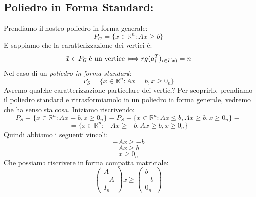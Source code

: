 \subsection{Poliedro in Forma Standard:} 
Prendiamo il nostro poliedro in forma generale:
\begin{equation*}
    P_{G} = \{x \in \mathbb{R}^{n}: Ax \geq b\}
\end{equation*}
E sappiamo che la caratterizzazione dei vertici è:
\begin{equation*}
    \bar{x} \in P_G \hspace{0.1cm} \text{è un vertice} \Longleftrightarrow rg(a_i^T)_{i \in I(\bar{x})} = n
\end{equation*}
Nel caso di un \textit{poliedro in forma standard}:
\begin{equation*}
    P_S = \{x \in \mathbb{R}^n: Ax = b, x \geq 0_n\}
\end{equation*}
Avremo qualche caratterizzazione particolare dei vertici? Per scoprirlo, prendiamo il poliedro standard e ritrasformiamolo in un poliedro in forma generale, vedremo che ha senso sta cosa. Iniziamo riscrivendo:
\begin{equation*}
    P_S = \{x \in \mathbb{R}^n: Ax = b, x \geq 0_n\} = P_S = \{x \in \mathbb{R}^n: Ax \leq b, Ax \geq b, x \geq 0_n\} = 
\end{equation*}
\begin{equation*}
    = \{x \in \mathbb{R}^n: - Ax \geq - b, Ax \geq b, x \geq 0_n\}
\end{equation*}
Quindi abbiamo i seguenti vincoli:
\begin{equation*}
    - Ax \geq - b
\end{equation*}
\begin{equation*}
    Ax \geq b
\end{equation*}
\begin{equation*}
    x \geq 0_n
\end{equation*}
Che possiamo riscrivere in forma compatta matriciale:
\begin{equation*}
    \begin{pmatrix}
        A\\
        -A\\
        I_n
    \end{pmatrix}x \geq \begin{pmatrix}
    b\\
    -b\\
    0_n
\end{pmatrix}
\end{equation*}
